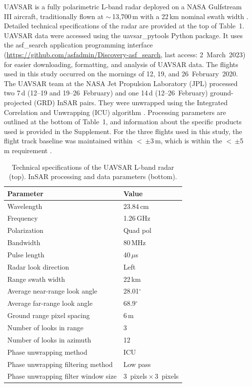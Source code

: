 UAVSAR is a fully polarimetric L-band radar deployed on a NASA Gulfstream III aircraft, traditionally flown at $\sim$\,13,700\,m with a 22\,km nominal swath width \citep{hensleyUAVSARInstrumentDescription2008, rosenUAVSARNewNASA2006}. Detailed technical specifications of the radar are provided at the top of Table~1. UAVSAR data were accessed using the uavsar\_pytools \citep{keskinenUavsarPytools2022} Python package. It uses the asf\_search application programming interface (\url{https://github.com/asfadmin/Discovery-asf_search}, last access: 2~March~2023) for easier downloading, formatting, and analysis of UAVSAR data. The flights used in this study occurred on the mornings of 12, 19, and 26~February~2020. The UAVSAR team at the NASA Jet Propulsion Laboratory (JPL) processed two 7\,d (12--19 and 19--26~February) and one 14\,d (12--26~February) ground-projected (GRD) InSAR pairs. They were unwrapped using the Integrated Correlation and Unwrapping (ICU) algorithm \citep{goldsteinSatelliteRadarInterferometry1988}. Processing parameters are outlined at the bottom of Table~1, and information about the specific products used is provided in the Supplement. For the three flights used in this study, the flight track baseline was maintained within $<$\,$\pm$3\,m, which is within the $<$\,$\pm$5\,m requirement \citep{hensleyUAVSARInstrumentDescription2008}.

\begin{table}[t]
\centering
\caption{Technical specifications of the UAVSAR L-band radar (top). InSAR processing and data parameters (bottom).}
\begin{tabular}{ll}
\toprule Parameter & Value \\
\midrule
Wavelength & 23.84\,cm \\
Frequency & 1.26\,GHz \\
Polarization & Quad pol \\
Bandwidth & 80\,MHz \\
Pulse length & 40\,$\mu$s \\
Radar look direction & Left \\
Range swath width & 22\,km \\
Average near-range look angle & 28.01$^{\circ}$\\
Average far-range look angle & 68.9$^{\circ}$\\
\midrule
Ground range pixel spacing & 6\,m \\
Number of looks in range & 3 \\
Number of looks in azimuth & 12 \\
Phase unwrapping method & ICU \\
Phase unwrapping filtering method & Low pass \\
Phase unwrapping filter window size & 3~pixels\,$\times$\,3~pixels \\
\bottomrule
\end{tabular}
\end{table}

